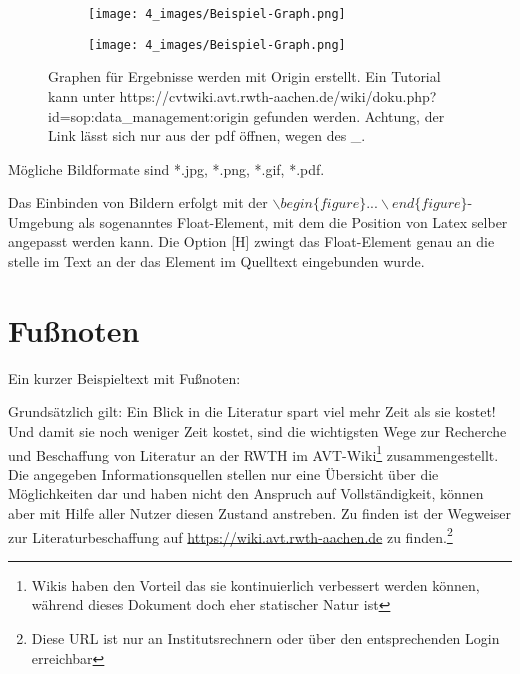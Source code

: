  \begin{figure}[H]
    \centering
        \begin{subfigure}[t]{0.45\textwidth}
            \centering
            \texttt{[image: 4\_images/Beispiel-Graph.png]}
            \caption{}
            \label{subfig:graph1}
        \end{subfigure}
        \hfill
        \begin{subfigure}[t]{0.45\textwidth}
            \centering
            \texttt{[image: 4\_images/Beispiel-Graph.png]}
            \caption{}
            \label{subfig:graph2}
        \end{subfigure}
    \caption{Graphen für Ergebnisse werden mit Origin erstellt. Ein Tutorial kann unter https://cvtwiki.avt.rwth-aachen.de/wiki/doku.php?id=sop:data\_management:origin gefunden werden. Achtung, der Link lässt sich nur aus der pdf öffnen, wegen des \_.}
    \label{fig:graphs}
\end{figure}


Mögliche Bildformate sind *.jpg, *.png, *.gif, *.pdf.

Das Einbinden von Bildern erfolgt mit der  $\backslash begin\{ figure\}...\backslash end\{ figure\}$-Umgebung als sogenanntes Float-Element, mit dem die Position von Latex selber angepasst werden kann. Die Option [H] zwingt das Float-Element genau an die stelle im Text an der das Element im Quelltext eingebunden wurde.

\section{Fußnoten}
Ein kurzer Beispieltext mit Fußnoten:

Grundsätzlich gilt: Ein Blick in die Literatur spart viel mehr
Zeit als sie kostet! Und damit sie noch weniger Zeit kostet, sind
die wichtigsten Wege zur Recherche und Beschaffung von Literatur
an der RWTH im AVT-Wiki\footnote{Wikis haben den Vorteil das sie
kontinuierlich verbessert werden können, während dieses Dokument
doch eher statischer Natur ist} zusammengestellt. Die angegeben
Informationsquellen stellen nur eine Übersicht über die
Möglichkeiten dar und haben nicht den Anspruch auf
Vollständigkeit, können aber mit Hilfe aller Nutzer diesen Zustand
anstreben. Zu finden ist der Wegweiser zur Literaturbeschaffung
auf
\url{https://wiki.avt.rwth-aachen.de}
zu finden.\footnote{Diese URL ist nur an Institutsrechnern oder
über den entsprechenden Login erreichbar}

